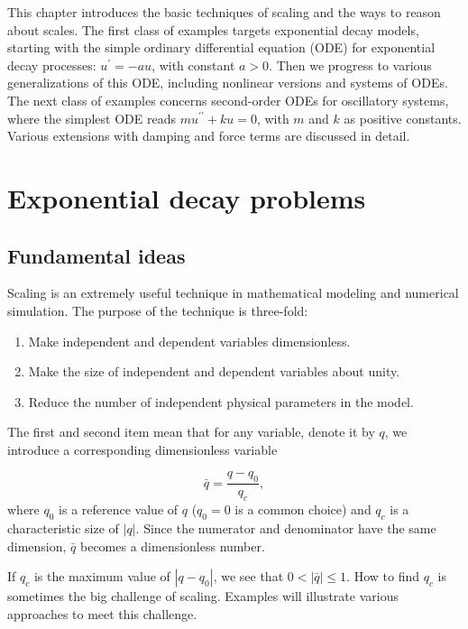 \documentclass[graybox,envcountchap,sectrefs,final]{svmonodo}
\begin{document}
This chapter introduces the basic techniques of scaling and the ways to
reason about scales. The first class of examples targets exponential
decay models, starting with the simple ordinary differential equation (ODE)
for exponential decay processes: $u^{\prime}=-au$, with constant $a>0$.
Then we progress to various generalizations of this ODE, including nonlinear
versions and systems of ODEs. The next class of examples concerns
second-order ODEs for oscillatory systems, where the simplest
ODE reads $mu^{\prime\prime} + ku=0$, with $m$ and $k$ as positive constants.
Various extensions with damping and force terms are discussed in detail.


\section{Exponential decay problems}
\label{sec:scale:decay}

\subsection{Fundamental ideas}



Scaling is an extremely useful technique in mathematical modeling and
numerical simulation.  The purpose of the technique is three-fold:

\begin{enumerate}
\item Make independent and dependent variables dimensionless.

\item Make the size of independent and dependent variables about unity.

\item Reduce the number of independent physical parameters in the model.
\end{enumerate}

\noindent
{}

The first and second item mean that for any variable, denote it by
$q$, we introduce a corresponding dimensionless variable

\[ \bar q = \frac{q-q_0}{q_c},\]
where $q_0$ is a reference value of $q$ ($q_0=0$ is a common choice) and
$q_c$ is a characteristic size of $|q|$. Since the numerator and denominator
have the same dimension, $\bar q$ becomes a dimensionless number.

If $q_c$ is the maximum value of $|q-q_0|$, we see that $0 < |\bar
q|\leq 1$. How to find $q_c$ is sometimes the big challenge of
scaling. Examples will illustrate various approaches to meet this
challenge.
\end{document}
